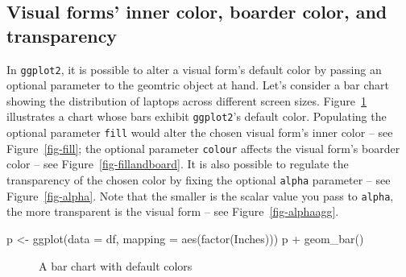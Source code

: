 \documentclass[
  letterpaper,
]{article}
\newenvironment{Shaded}{\begin{snugshade}}{\end{snugshade}}
\newcommand{\AttributeTok}[1]{\textcolor[rgb]{0.40,0.45,0.13}{#1}}
\newcommand{\FunctionTok}[1]{\textcolor[rgb]{0.28,0.35,0.67}{#1}}
\newcommand{\NormalTok}[1]{\textcolor[rgb]{0.00,0.23,0.31}{#1}}
\newcommand{\OtherTok}[1]{\textcolor[rgb]{0.00,0.23,0.31}{#1}}
\newcommand{\SpecialCharTok}[1]{\textcolor[rgb]{0.37,0.37,0.37}{#1}}
\begin{document}
\subsection{Visual forms' inner color, boarder color, and
transparency}\label{visual-forms-inner-color-boarder-color-and-transparency}

In \texttt{ggplot2}, it is possible to alter a visual form's default
color by passing an optional parameter to the geomtric object at hand.
Let's consider a bar chart showing the distribution of laptops across
different screen sizes. Figure~\ref{fig-base} illustrates a chart whose
bars exhibit \texttt{ggplot2}'s default color. Populating the optional
parameter \texttt{fill} would alter the chosen visual form's inner color
-- see Figure~\ref{fig-fill}; the optional parameter \texttt{colour}
affects the visual form's boarder color -- see
Figure~\ref{fig-fillandboard}. It is also possible to regulate the
transparency of the chosen color by fixing the optional \texttt{alpha}
parameter -- see Figure~\ref{fig-alpha}. Note that the smaller is the
scalar value you pass to \texttt{alpha}, the more transparent is the
visual form -- see Figure~\ref{fig-alphaagg}.

\begin{Shaded}
\begin{Highlighting}[]
\NormalTok{p }\OtherTok{\textless{}{-}} \FunctionTok{ggplot}\NormalTok{(}\AttributeTok{data =}\NormalTok{ df, }\AttributeTok{mapping =} \FunctionTok{aes}\NormalTok{(}\FunctionTok{factor}\NormalTok{(Inches)))}
\NormalTok{p }\SpecialCharTok{+} \FunctionTok{geom\_bar}\NormalTok{()}
\end{Highlighting}
\end{Shaded}

\begin{figure}[H]


\caption{\label{fig-base}A bar chart with default colors}

\end{figure}%
\end{document}

